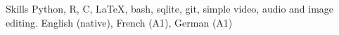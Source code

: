 
\begin{rubric}{Skills}
	Python, R, C, \LaTeX, bash, {\sc sqlite}, git, simple video, audio and image editing.
    English (native), French (A1), German (A1)
\end{rubric}
